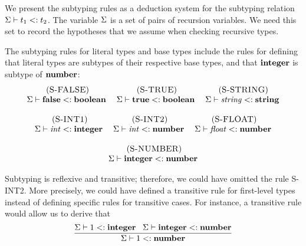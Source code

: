 We present the subtyping rules as a deduction system for the
subtyping relation $\Sigma \vdash t_{1} <: t_{2}$.
The variable $\Sigma$ is a set of pairs of recursion variables.
We need this set to record the hypotheses that we assume when checking
recursive types.

The subtyping rules for literal types and base types include the rules
for defining that literal types are subtypes of their respective base types,
and that $\mathbf{integer}$ is subtype of $\mathbf{number}$:
\[
\begin{array}{c}
\begin{array}{c}
\; (\textsc{S-FALSE})\\
\Sigma \vdash \mathbf{false} <: \mathbf{boolean}
\end{array}
\;
\begin{array}{c}
\; (\textsc{S-TRUE})\\
\Sigma \vdash \mathbf{true} <: \mathbf{boolean}
\end{array}
\;
\begin{array}{c}
\; (\textsc{S-STRING})\\
\Sigma \vdash {\it string} <: \mathbf{string}
\end{array}
\\ \\
\begin{array}{c}
\; (\textsc{S-INT1})\\
\Sigma \vdash {\it int} <: \mathbf{integer}
\end{array}
\;
\begin{array}{c}
\; (\textsc{S-INT2})\\
\Sigma \vdash {\it int} <: \mathbf{number}
\end{array}
\;
\begin{array}{c}
\; (\textsc{S-FLOAT})\\
\Sigma \vdash {\it float} <: \mathbf{number}
\end{array}
\\ \\
\begin{array}{c}
\; (\textsc{S-NUMBER})\\
\Sigma \vdash \mathbf{integer} <: \mathbf{number}
\end{array}
\end{array}
\]

Subtyping is reflexive and transitive;
therefore, we could have omitted the rule \textsc{S-INT2}.
More precisely, we could have defined a transitive rule for first-level
types instead of defining specific rules for transitive cases.
For instance, a transitive rule would allow us to derive that
\[
\dfrac{\Sigma \vdash 1 <: \mathbf{integer} \;\;\;
       \Sigma \vdash \mathbf{integer} <: \mathbf{number}}
      {\Sigma \vdash 1 <: \mathbf{number}}
\]

